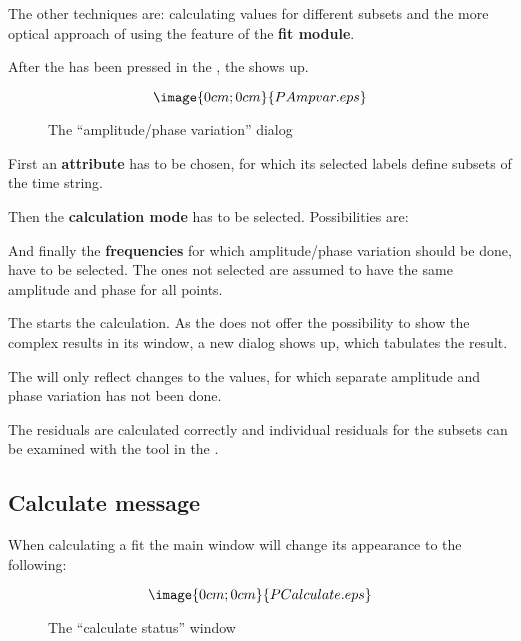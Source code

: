 The other techniques are: calculating values for different subsets
and the more optical approach of using the
 feature of the {\bf fit module}.

After the  has been pressed
in the , the
 shows up.

\begin{figure}[h]
$$\image{0cm;0cm}{PAmpvar.eps}$$%
\caption{The ``amplitude/phase variation'' dialog}%
\label{period.ampvar.dialog}
\end{figure}

First an {\bf attribute} has to be chosen, for which its selected labels 
define subsets of the time string.

Then the {\bf calculation mode} has to be selected. 
Possibilities are:

And finally the {\bf frequencies} for which amplitude/phase 
variation should be done, have to be selected. The ones not selected 
are assumed to have the same amplitude and phase for all points.

The  starts the calculation. 
As the  does not offer
the possibility to show the complex results in its window,
a new dialog shows up, which tabulates the result.

The  will only reflect 
changes to the values, for which separate amplitude and phase variation
has not been done.

The residuals are calculated correctly and individual residuals for
the subsets can be examined with the 
 tool in the
.

\subsection{Calculate message}%
\label{period.calculate}
When calculating a fit the main window will change its appearance 
to the following:
\begin{figure}[h]
$$\image{0cm;0cm}{PCalculate.eps}$$%
\caption{The ``calculate status'' window}%
\label{period.calculate.message}
\end{figure}

